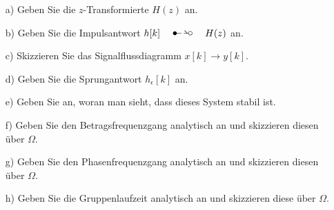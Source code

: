 \begin{itemize}
\item[a)] Geben Sie die $z$-Transformierte $H(z)$ an.
\item[b)] Geben Sie die Impulsantwort $h[k] \quad\Ztransf\quad H(z)$ an.
\item[c)] Skizzieren Sie das Signalflussdiagramm $x[k] \rightarrow y[k]$.
\item[d)] Geben Sie die Sprungantwort $h_\epsilon[k]$ an.
\item[e)] Geben Sie an, woran man sieht, dass dieses System stabil ist.
\item[f)] Geben Sie den Betragsfrequenzgang analytisch an und skizzieren diesen über $\Omega$.
\item[g)] Geben Sie den Phasenfrequenzgang analytisch an und skizzieren diesen über $\Omega$.
\item[h)] Geben Sie die Gruppenlaufzeit analytisch an und skizzieren diese über $\Omega$.
\end{itemize}

